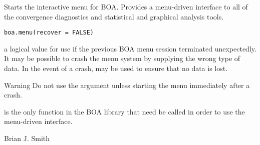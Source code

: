\begin{Description}\relax
Starts the interactive menu for BOA.  Provides a menu-driven interface to
all of the convergence diagnostics and statistical and graphical analysis
tools.
\end{Description}
\begin{Usage}
\begin{verbatim}
boa.menu(recover = FALSE)
\end{verbatim}
\end{Usage}
\begin{Arguments}
\begin{ldescription}
\item[\code{recover}] a logical value for use if the previous BOA menu session
terminated unexpectedly.  It may be possible to crash the menu system by
supplying the wrong type of data.  In the event of a crash, 
may be used to ensure that no data is lost.
\end{ldescription}
\end{Arguments}
\begin{Section}{Warning}
Do not use the  argument unless starting the menu
immediately after a crash.
\end{Section}
\begin{Note}\relax
{} is the only function in the BOA library that need be called in
order to use the menu-driven interface.
\end{Note}
\begin{Author}\relax
Brian J. Smith
\end{Author}

